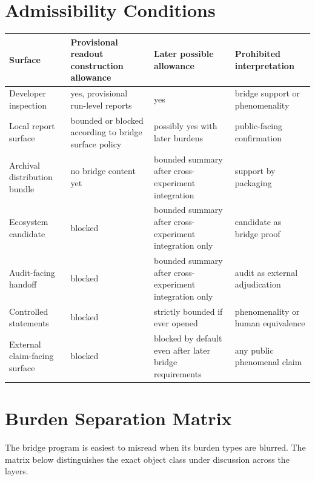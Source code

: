 \documentclass[11pt,a4paper]{article}
\theoremstyle{definition}
\begin{document}
\section{Admissibility Conditions}
\begin{center}
\small
\begin{tabularx}{\linewidth}{@{}>{\raggedright\arraybackslash}p{}>{\raggedright\arraybackslash}p{}>{\raggedright\arraybackslash}p{}>{\raggedright\arraybackslash}p{}@{}}
\toprule
Surface & Provisional readout construction allowance & Later possible allowance & Prohibited interpretation \\
\midrule
Developer inspection & yes, provisional run-level reports & yes & bridge support or phenomenality \\
Local report surface & bounded or blocked according to bridge surface policy & possibly yes with later burdens & public-facing confirmation \\
Archival distribution bundle & no bridge content yet & bounded summary after cross-experiment integration & support by packaging \\
Ecosystem candidate & blocked & bounded summary after cross-experiment integration only & candidate as bridge proof \\
Audit-facing handoff & blocked & bounded summary after cross-experiment integration only & audit as external adjudication \\
Controlled statements & blocked & strictly bounded if ever opened & phenomenality or human equivalence \\
External claim-facing surface & blocked & blocked by default even after later bridge requirements & any public phenomenal claim \\
\bottomrule
\end{tabularx}
\end{center}

\section{Burden Separation Matrix}
The bridge program is easiest to misread when its burden types are blurred. The matrix below distinguishes the exact object class under discussion across the layers.
\end{document}
